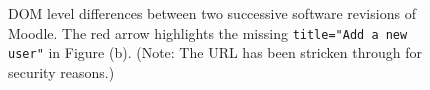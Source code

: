 
\begin{figure}[ht!] 
\centering     %
{}
  \captionsetup{justification=justified,
singlelinecheck=false}
\caption{DOM level differences between two successive software revisions of Moodle. The red arrow highlights the missing \texttt{title="Add a new user"} in Figure (b). (Note: The URL has been stricken through for security reasons.)}
\label{fig:moodleDOM}
\end{figure} 


